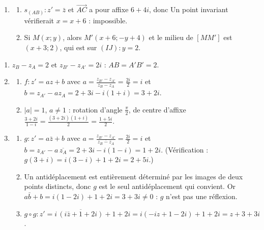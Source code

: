 \begin{corrige}
\begin{sol}
\begin{enumerate}
      \item \begin{enumerate}
                  \item $s_{(AB)} : z' = \bar{z}$ et $\overrightarrow{AC}$ a pour affixe $6 + 4i$, donc 
                        Un point invariant vérifierait $x = x + 6$ : impossible.
                  \item Si $M(x;y)$, alors $M'(x+6; -y+4)$ et le milieu de $[MM']$ est $(x+3; 2)$, qui est sur $(IJ) : y = 2$.
            \end{enumerate}
\end{enumerate}
\end{sol}
\begin{sol}
\begin{enumerate}
      \item $z_B - z_A = 2$ et $z_{B'} - z_{A'} = 2i$ : $AB = A'B' = 2$.
      \item \begin{enumerate}
                  \item $f : z' = az + b$ avec $a = \frac{z_{B'} - z_{A'}}{z_B - z_A} = \frac{2i}{2} = i$ et
                        $b = z_{A'} - a z_A = 2 + 3i - i(1+i) = 3 + 2i$. 
                  \item $|a| = 1$, $a \neq 1$ : rotation d'angle $\frac{\pi}{2}$, de centre d'affixe
                        $\frac{3+2i}{1-i} = \frac{(3+2i)(1+i)}{2} = \frac{1 + 5i}{2}$.
            \end{enumerate}
      \item \begin{enumerate}
                  \item $g : z' = a\bar{z} + b$ avec $a = \frac{z_{B'} - z_{A'}}{\overline{z_B - z_A}} = \frac{2i}{2} = i$ et
                        $b = z_{A'} - a\,\overline{z_A} = 2 + 3i - i(1 - i) = 1 + 2i$. 
                        (Vérification : $g(3+i) = i(3 - i) + 1 + 2i = 2 + 5i$.)
                  \item Un antidéplacement est entièrement déterminé par les images de deux points distincts, donc $g$ est le seul antidéplacement qui convient.
                        Or $a\bar{b} + b = i(1 - 2i) + 1 + 2i = 3 + 3i \neq 0$ : $g$ n'est pas une réflexion.
                  \item $g \circ g : z' = i\,\overline{(i\bar{z} + 1 + 2i)} + 1 + 2i = i(-iz + 1 - 2i) + 1 + 2i = z + 3 + 3i$.

\end{enumerate}
\end{enumerate}
\end{sol}
\end{corrige}
